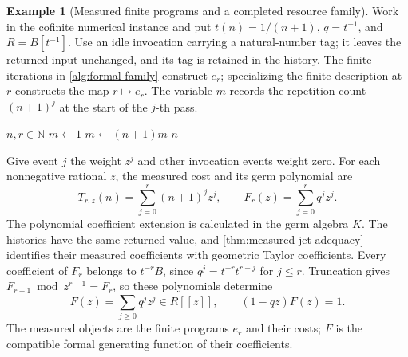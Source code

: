 \documentclass[11pt,a4paper]{article}
\numberwithin{algorithm}{section}
\numberwithin{equation}{section}
\theoremstyle{definition}
\newtheorem{example}[example]{Example}
\theoremstyle{remark}
\theoremstyle{plain}
\newcommand{\N}{\mathbb N}
\theoremstyle{definition}
\theoremstyle{plain}
\begin{document}
\begin{example}[Measured finite programs and a completed resource family]
\label{ex:measured-formal-family}
Work in the cofinite numerical instance and put
$t(n)=1/(n+1)$, $q=t^{-1}$, and $R=B[t^{-1}]$.
Use an idle invocation carrying a natural-number tag; it leaves the
returned input unchanged, and its tag is retained in the history.
The finite iterations in \cref{alg:formal-family} construct $e_r$;
specializing the finite description at $r$ constructs the map
$r\mapsto e_r$. The variable $m$ records the repetition count
$(n+1)^j$ at the start of the $j$-th pass.
\begin{algorithm}[H]
\caption{A finite program for the order-$r$ measured family}\label{alg:formal-family}
\small
\begin{algorithmic}[1]
\Require $n,r\in\N$
\State $m\gets1$
    \State {}
  \EndFor
  \State $m\gets(n+1)m$
\EndFor
\State \Return $n$
\end{algorithmic}
\end{algorithm}

Give event $j$ the weight $z^j$ and other invocation events weight zero.
For each nonnegative rational $z$,
the measured cost and its germ polynomial are
\begin{equation}\label{eq:measured-geometric-series}
 T_{r,z}(n)=\sum_{j=0}^r(n+1)^jz^j,
 \qquad F_r(z)=\sum_{j=0}^rq^jz^j.
\end{equation}
The polynomial coefficient extension is calculated in the germ algebra $K$. The histories have the same returned value, and
\cref{thm:measured-jet-adequacy} identifies their measured coefficients
with geometric Taylor coefficients. Every coefficient of $F_r$ belongs
to $t^{-r}B$, since $q^j=t^{-r}t^{r-j}$ for $j\le r$.
Truncation gives $F_{r+1}\bmod z^{r+1}=F_r$, so these polynomials
determine
\[
 F(z)=\sum_{j\ge0}q^jz^j\in R[[z]],\qquad (1-qz)F(z)=1.
\]
The measured objects are the finite programs $e_r$ and their costs;
$F$ is the compatible formal generating function of their coefficients.
\end{example}
\end{document}
